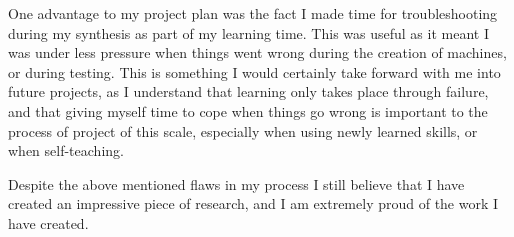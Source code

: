 One advantage to my project plan was the fact I made time for troubleshooting during my synthesis as part of my learning time. This was useful as it meant I was under less pressure when things went wrong during the creation of machines, or during testing. This is something I would certainly take forward with me into future projects, as I understand that learning only takes place through failure, and that giving myself time to cope when things go wrong is important to the process of project of this scale, especially when using newly learned skills, or when self-teaching.


Despite the above mentioned flaws in my process I still believe that I have created an impressive piece of research, and I am extremely proud of the work I have created.